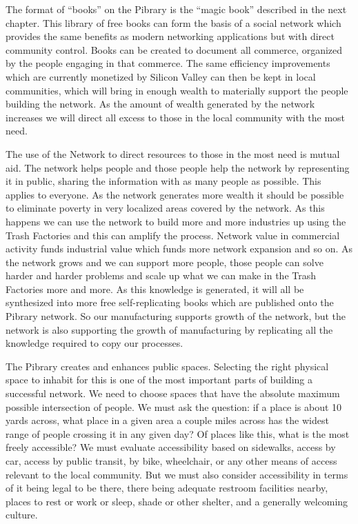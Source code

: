 The format of ``books'' on the Pibrary is the ``magic book'' described
in the next chapter. This library of free books can form the basis of a
social network which provides the same benefits as modern networking
applications but with direct community control. Books can be created to
document all commerce, organized by the people engaging in that
commerce. The same efficiency improvements which are currently monetized
by Silicon Valley can then be kept in local communities, which will
bring in enough wealth to materially support the people building the
network. As the amount of wealth generated by the network increases we
will direct all excess to those in the local community with the most
need.

The use of the Network to direct resources to those in the most need is
mutual aid. The network helps people and those people help the network
by representing it in public, sharing the information with as many
people as possible. This applies to everyone. As the network generates
more wealth it should be possible to eliminate poverty in very localized
areas covered by the network. As this happens we can use the network to
build more and more industries up using the Trash Factories and this can
amplify the process. Network value in commercial activity funds
industrial value which funds more network expansion and so on. As the
network grows and we can support more people, those people can solve
harder and harder problems and scale up what we can make in the Trash
Factories more and more. As this knowledge is generated, it will all be
synthesized into more free self-replicating books which are published
onto the Pibrary network. So our manufacturing supports growth of the
network, but the network is also supporting the growth of manufacturing
by replicating all the knowledge required to copy our processes.

The Pibrary creates and enhances public spaces. Selecting the right
physical space to inhabit for this is one of the most important parts of
building a successful network. We need to choose spaces that have the
absolute maximum possible intersection of people. We must ask the
question: if a place is about 10 yards across, what place in a given
area a couple miles across has the widest range of people crossing it in
any given day? Of places like this, what is the most freely accessible?
We must evaluate accessibility based on sidewalks, access by car, access
by public transit, by bike, wheelchair, or any other means of access
relevant to the local community. But we must also consider accessibility
in terms of it being legal to be there, there being adequate restroom
facilities nearby, places to rest or work or sleep, shade or other
shelter, and a generally welcoming culture.

